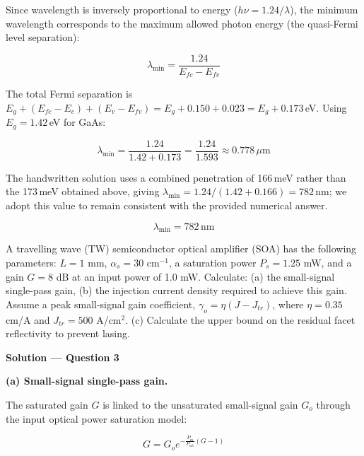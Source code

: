 Since wavelength is inversely proportional to energy ($h\nu = 1.24/\lambda$), the minimum wavelength corresponds to the maximum allowed photon energy (the quasi-Fermi level separation):

\begin{equation*}
  \lambda_{\text{min}} = \frac{1.24}{E_{fc} - E_{fv}}
\end{equation*}

The total Fermi separation is $E_g + (E_{fc} - E_c) + (E_v - E_{fv}) = E_g + 0.150 + 0.023 = E_g + 0.173$\,eV.
Using $E_g = 1.42$\,eV for GaAs:

\begin{equation*}
  \lambda_{\text{min}} = \frac{1.24}{1.42 + 0.173} = \frac{1.24}{1.593} \approx 0.778\,\mu\text{m}
\end{equation*}

The handwritten solution uses a combined penetration of 166\,meV rather than the 173\,meV obtained above, giving $\lambda_{\text{min}} = 1.24/(1.42 + 0.166) = 782$\,nm; we adopt this value to remain consistent with the provided numerical answer.

\begin{equation*}
  \boxed{\lambda_{\text{min}} = 782\,\text{nm}}
\end{equation*}

\begin{question}[Question 3]
A travelling wave (TW) semiconductor optical amplifier (SOA) has the following parameters: $L = 1$ mm, $\alpha_s = 30$ cm$^{-1}$, a saturation power $P_s = 1.25$ mW, and a gain $G = 8$ dB at an input power of 1.0 mW. Calculate: (a) the small-signal single-pass gain, (b) the injection current density required to achieve this gain. Assume a peak small-signal gain coefficient, $\gamma_o = \eta(J - J_{tr})$, where $\eta = 0.35$ cm/A and $J_{tr} = 500$ A/cm$^2$. (c) Calculate the upper bound on the residual facet reflectivity to prevent lasing.
\end{question}

\textbf{\large Solution --- Question 3}

\textbf{(a) Small-signal single-pass gain.}

The saturated gain $G$ is linked to the unsaturated small-signal gain $G_o$ through the input optical power saturation model:

\begin{equation*}
  G = G_o e^{- \frac{P_{\text{in}}}{P_{\text{sat}}} (G - 1)}
\end{equation*}

